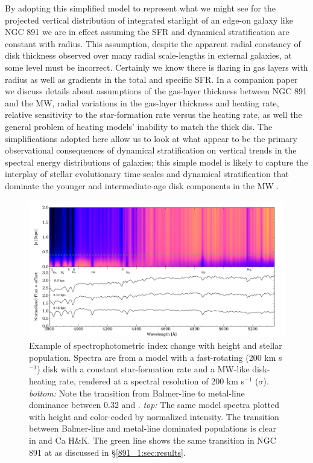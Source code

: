 By adopting this simplified model to represent what we might see for
the projected vertical distribution of integrated starlight of an
edge-on galaxy like NGC 891 we are in effect assuming the SFR and
dynamical stratification are constant with radius. This assumption,
despite the apparent radial constancy of disk thickness observed over
many radial scale-lengths in external galaxies, at some level must be
incorrect. Certainly we know there is flaring in gas layers with
radius as well as gradients in the total and specific SFR.  In a
companion paper we discuss details about assumptions of the gas-layer
thickness between NGC 891 and the MW, radial variations in the
gas-layer thickness and heating rate, relative sensitivity to the
star-formation rate versus the heating rate, as well the general
problem of heating models' inability to match the thick dis. The
simplifications adopted here allow us to look at what appear to be the
primary observational consequences of dynamical stratification on
vertical trends in the spectral energy distributions of galaxies; this
simple model is likely to capture the interplay of stellar
evolutionary time-scales and dynamical stratification that dominate
the younger and intermediate-age disk components in the MW
\citep{Bird13}.

\begin{figure}
  \centering
  \includegraphics[width=\textwidth]{891_1/figs/mab_stack.pdf}
  \caption[Heating signature in Milky Way
  model]{\label{891_1:fig:MW_heating}\fixspacing Example of
    spectrophotometric index change with height and stellar
    population. Spectra are from a model with a fast-rotating (200 km
    s$^{-1}$) disk with a constant star-formation rate and a MW-like
    disk-heating rate, rendered at a spectral resolution of 200 km
    s$^{-1}$ ($\sigma$).  \emph{bottom:} Note the transition from
    Balmer-line to metal-line dominance between 0.32 and
    . \emph{top:} The same model spectra plotted with
    height and color-coded by normalized intensity. The transition
    between Balmer-line and metal-line dominated populations is clear
    in \Hda and Ca H\&K. 
The green line shows the same transition in NGC 891 at
     as discussed in \S\ref{891_1:sec:results}.}
\end{figure}

